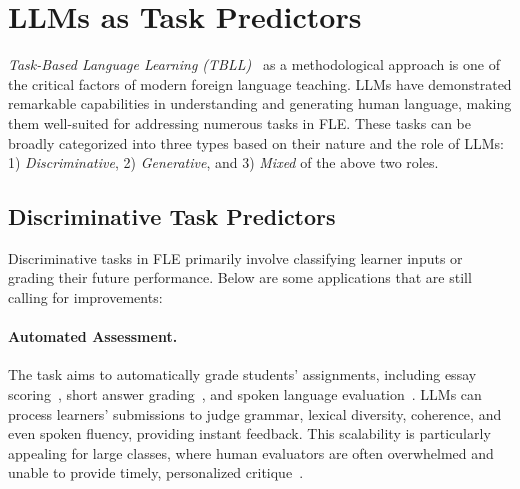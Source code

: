 \section{LLMs as Task Predictors}\label{sec:predictor}
\textit{Task-Based Language Learning (TBLL)}~\cite{nunan1989designing,willis2021framework} as a methodological approach is one of the critical factors of modern foreign language teaching. LLMs have demonstrated remarkable capabilities in understanding and generating human language, making them well-suited for addressing numerous tasks in FLE. These tasks can be broadly categorized into three types based on their nature and the role of LLMs: 1) \textit{Discriminative}, 2) \textit{Generative}, and 3) \textit{Mixed} of the above two roles.

\subsection{Discriminative Task Predictors}
Discriminative tasks in FLE primarily involve classifying learner inputs or grading their future performance. Below are some applications that are still calling for improvements:


\paragraph{Automated Assessment.}  The task aims to automatically grade students’ assignments, including essay scoring~\cite{sessler2024can,li2024applying,syamkumar2024improving}, short answer grading~\cite{schneider2023towards,henkel2024can}, and spoken language evaluation~\cite{gao2023investigation,fu2024pronunciation}. LLMs can process learners’ submissions to judge grammar, lexical diversity, coherence, and even spoken fluency, providing instant feedback. This scalability is particularly appealing for large classes, where human evaluators are often overwhelmed and unable to provide timely, personalized critique~\cite{mizumoto2023exploring}.

